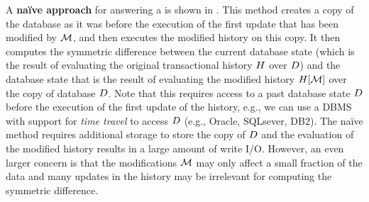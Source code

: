 A \textbf{naïve approach} for answering a \abbrHW is shown in . This method creates a copy of the database as it was before the execution of the first update that has been modified by $\mathcal{M}$, and then executes the modified history on this copy. %
It then computes the symmetric difference between the current database state (which is the result of evaluating the original transactional history $H$ over $D$) and the database state that is the result of evaluating the modified history $H[\mathcal{M}]$ over the copy of database $D$.  %
Note that this requires access to a past database state $D$ before the execution of the first update of the history, e.g., we can use a DBMS with support for \textit{time travel} to access $D$ (e.g., Oracle, SQLsever, DB2).
The naïve method requires additional storage to store the copy of $D$ and the evaluation of the modified history results in a large amount of write I/O. %
However, an even larger concern is that the modifications  $\mathcal{M}$ may only affect a small fraction of the data and many updates in the history may be irrelevant for computing the symmetric difference. %



